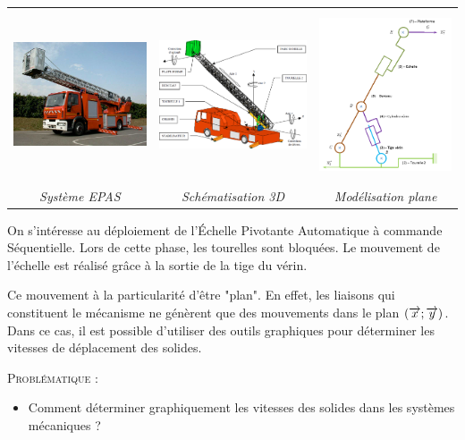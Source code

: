 \documentclass[11pt,oneside]{article}
\begin{document}
\begin{center}
\begin{tabular}{ccc}
\includegraphics[height=3.5cm]{png/fig1} &
\includegraphics[height=3.5cm]{png/fig2} &
\includegraphics[height=5cm]{png/fig4} \\
\textit{Système EPAS} & \textit{Schématisation 3D}&\textit{Modélisation plane}\\
\end{tabular}
\end{center}

\vspace{.2cm}

On s'intéresse au déploiement de l'Échelle Pivotante Automatique à commande Séquentielle. Lors de cette phase, les tourelles sont bloquées. Le mouvement de l'échelle est réalisé grâce à la sortie de la tige du vérin. 

Ce mouvement à la particularité d'être "plan". En effet, les liaisons qui constituent le mécanisme ne génèrent que des mouvements dans le plan $\left( \overrightarrow{x}; \overrightarrow{y}\right)$. Dans ce cas, il est possible d'utiliser des outils graphiques pour déterminer les vitesses de déplacement des solides. 

\begin{prob}
\textsc{Problématique :}
\begin{itemize}
\item Comment déterminer graphiquement les vitesses des solides dans les systèmes mécaniques ?
\end{itemize}
\end{prob}
\end{document}
